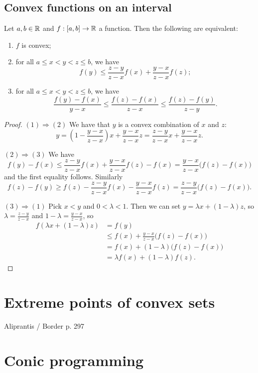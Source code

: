\subsection{Convex functions on an interval}
\begin{proposition}
Let $a,b\in \mathbb{R}$ and $f: \interval{a,b}\to \R$ a function. Then the following are equivalent:
\begin{enumerate}
\item $f$ is convex;
\item for all $a \leq x<y<z \leq b$, we have
\[ f(y) \leq \frac{z-y}{z-x}f(x) + \frac{y-x}{z-x}f(z); \]
\item for all $a \leq x<y<z \leq b$, we have
\[ \frac{f(y)-f(x)}{y-x} \leq \frac{f(z)-f(x)}{z-x} \leq \frac{f(z)-f(y)}{z-y}. \]
\end{enumerate}
\end{proposition}
\begin{proof}
$(1) \Rightarrow (2)$ We have that $y$ is a convex combination of $x$ and $z$:
\[ y = \left(1 - \frac{y-x}{z-x}\right)x + \frac{y-x}{z-x}z =  \frac{z-y}{z-x}x + \frac{y-x}{z-x}z. \]

$(2) \Rightarrow (3)$ We have
\[ f(y) - f(x) \leq \frac{z-y}{z-x}f(x) + \frac{y-x}{z-x}f(z) - f(x) = \frac{y-x}{z-x}\big(f(z)-f(x)\big) \]
and the first equality follows. Similarly
\[ f(z) - f(y) \geq f(z) - \frac{z-y}{z-x}f(x) - \frac{y-x}{z-x}f(z) = \frac{z-y}{z-x}\big(f(z)-f(x)\big). \]

$(3) \Rightarrow (1)$ Pick $x<y$ and $0<\lambda< 1$. Then we can set $y = \lambda x + (1-\lambda)z$, so $\lambda = \frac{z-y}{z-x}$ and $1-\lambda = \frac{y-x}{z-x}$, so
\begin{align*}
f(\lambda x + (1-\lambda)z) &= f(y) \\
&\leq f(x) + \frac{y-x}{z-x}\big(f(z)-f(x)\big) \\
&= f(x) + (1-\lambda)\big(f(z) - f(x)\big) \\
&= \lambda f(x) + (1-\lambda)f(z).
\end{align*}
\end{proof}

\section{Extreme points of convex sets}
\begin{theorem}
Aliprantis / Border p. 297
\end{theorem}

\section{Conic programming}
